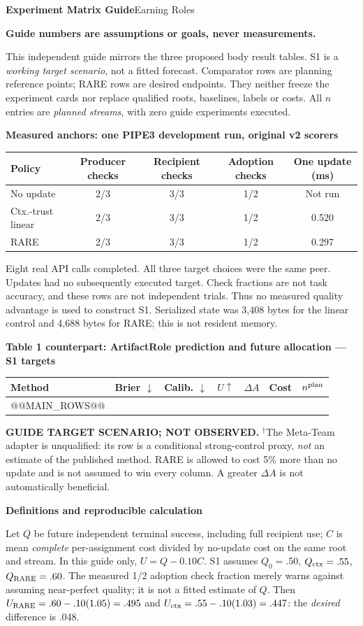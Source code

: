 \documentclass[10pt,a4paper]{article}
\newcommand{\status}{\textcolor{red!70!black}{\textbf{Guide numbers are assumptions or goals, never measurements.}}\par}
\newcommand{\lead}[1]{\vspace{4pt}\textbf{#1}\par}
\begin{document}
{\Large\bfseries Experiment Matrix Guide}\hfill{\small Earning Roles}
\par\status
This independent guide mirrors the three proposed body result tables. S1 is a
\emph{working target scenario}, not a fitted forecast. Comparator rows are
planning reference points; RARE rows are desired endpoints. They neither freeze
the experiment cards nor replace qualified roots, baselines, labels or costs.
All $n$ entries are \emph{planned streams}, with zero guide experiments executed.

\lead{Measured anchors: one PIPE3 development run, original v2 scorers}
\begin{center}\small
\begin{tabular}{@{}lcccc@{}}\toprule
Policy & Producer checks & Recipient checks & Adoption checks & One update (ms)\\\midrule
No update & 2/3 & 3/3 & 1/2 & Not run\\
Ctx.-trust linear & 2/3 & 3/3 & 1/2 & 0.520\\
RARE & 2/3 & 3/3 & 1/2 & 0.297\\\bottomrule
\end{tabular}\end{center}
Eight real API calls completed. All three target choices were the same peer.
Updates had no subsequently executed target. Check fractions are not task
accuracy, and these rows are not independent trials. Thus no measured quality
advantage is used to construct S1. Serialized state was 3,408 bytes for the
linear control and 4,688 bytes for RARE; this is not resident memory.

\lead{Table 1 counterpart: ArtifactRole prediction and future allocation --- S1 targets}
\begin{center}\small
\begin{tabular*}{\linewidth}{@{\extracolsep{\fill}}lrrrrrr@{}}\toprule
Method & Brier $\downarrow$ & Calib. $\downarrow$ & $U\uparrow$ & $\Delta A$ & Cost & $n^{\rm plan}$\\\midrule
@@MAIN_ROWS@@
\bottomrule\end{tabular*}\end{center}
\textbf{GUIDE TARGET SCENARIO; NOT OBSERVED.} $^{\dagger}$The Meta-Team adapter is
unqualified: its row is a conditional strong-control proxy, \emph{not} an
estimate of the published method. RARE is allowed to cost 5\% more than no
update and is not assumed to win every column. A greater $\Delta A$ is not
automatically beneficial.

\lead{Definitions and reproducible calculation}
Let $Q$ be future independent terminal success, including full recipient use;
$C$ is mean \emph{complete} per-assignment cost divided by no-update cost on the
same root and stream. In this guide only, $U=Q-0.10C$. S1 assumes
$Q_0=.50$, $Q_{\rm ctx}=.55$, $Q_{\rm RARE}=.60$. The measured 1/2 adoption
check fraction merely warns against assuming near-perfect quality; it is not
a fitted estimate of $Q$. Then $U_{\rm RARE}=.60-.10(1.05)=.495$ and
$U_{\rm ctx}=.55-.10(1.03)=.447$: the \emph{desired} difference is .048.
\end{document}
